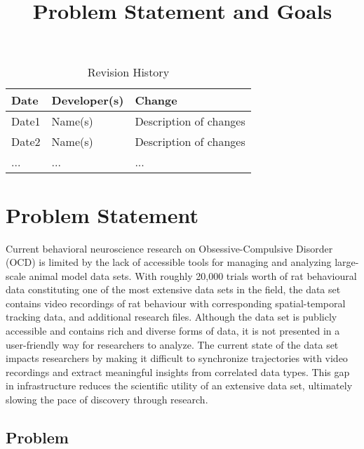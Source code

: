 \documentclass{article}
\title{Problem Statement and Goals\\\progname}
\author{\authname}
\date{}
\begin{document}
\maketitle

\begin{table}[hp]
\caption{Revision History} \label{TblRevisionHistory}
\begin{tabularx}{\textwidth}{llX}
\toprule
\textbf{Date} & \textbf{Developer(s)} & \textbf{Change}\\
\midrule
Date1 & Name(s) & Description of changes\\
Date2 & Name(s) & Description of changes\\
... & ... & ...\\
\bottomrule
\end{tabularx}
\end{table}

\section{Problem Statement}

\par{Current behavioral neuroscience research on Obsessive-Compulsive Disorder (OCD) is limited by the lack of 
accessible tools for managing and analyzing large-scale animal model data sets. With roughly 20,000 trials worth 
of rat behavioural data constituting one of the most extensive data sets in the field, the data set contains 
video recordings of rat behaviour with corresponding spatial-temporal tracking data, and additional research files. 
Although the data set is publicly accessible and contains rich and diverse forms of data, it is not presented in a 
user-friendly way for researchers to analyze. The current state of the data set impacts researchers by making it 
difficult to synchronize trajectories with video recordings and extract meaningful insights from correlated data types. 
This gap in infrastructure reduces the scientific utility of an extensive data set, ultimately slowing the pace of 
discovery through research.}



\subsection{Problem}
\end{document}

